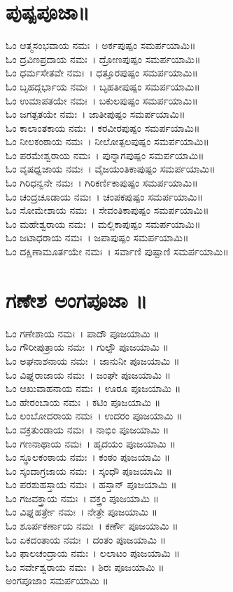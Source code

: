 \section{ಪುಷ್ಪಪೂಜಾ॥}
ಓಂ ಆತ್ಮಸಂಭವಾಯ ನಮಃ~। ಅರ್ಕಪುಷ್ಪಂ ಸಮರ್ಪಯಾಮಿ॥\\
ಓಂ ದ್ರವಿಣಪ್ರದಾಯ ನಮಃ~। ದ್ರೋಣಪುಷ್ಪಂ ಸಮರ್ಪಯಾಮಿ॥\\
ಓಂ ಧರ್ಮಸೇತವೇ ನಮಃ~। ಧತ್ತೂರಪುಷ್ಪಂ ಸಮರ್ಪಯಾಮಿ॥\\
ಓಂ ಬೃಹದ್ಗರ್ಭಾಯ ನಮಃ~। ಬೃಹತೀಪುಷ್ಪಂ ಸಮರ್ಪಯಾಮಿ॥\\
ಓಂ ಉಮಾಪತಯೇ ನಮಃ~। ಬಕುಲಪುಷ್ಪಂ ಸಮರ್ಪಯಾಮಿ॥\\
ಓಂ ಜಗತ್ಪತಯೇ ನಮಃ~। ಜಾತೀಪುಷ್ಪಂ ಸಮರ್ಪಯಾಮಿ॥\\
ಓಂ ಕಾಲಾಂತಕಾಯ ನಮಃ~। ಕರವೀರಪುಷ್ಪಂ ಸಮರ್ಪಯಾಮಿ॥\\
ಓಂ ನೀಲಕಂಠಾಯ ನಮಃ~। ನೀಲೋತ್ಪಲಪುಷ್ಪಂ ಸಮರ್ಪಯಾಮಿ॥\\
ಓಂ ಪರಮೇಶ್ವರಾಯ ನಮಃ~। ಪುನ್ನಾಗಪುಷ್ಪಂ ಸಮರ್ಪಯಾಮಿ॥\\
ಓಂ ವೃಷಧ್ವಜಾಯ ನಮಃ~। ವೈಜಯಂತಿಕಾಪುಷ್ಪಂ ಸಮರ್ಪಯಾಮಿ॥\\
ಓಂ ಗಿರಿಧನ್ವನೇ ನಮಃ~। ಗಿರಿಕರ್ಣಿಕಾಪುಷ್ಪಂ ಸಮರ್ಪಯಾಮಿ॥\\
ಓಂ ಚಂದ್ರಚೂಡಾಯ ನಮಃ~। ಚಂಪಕಪುಷ್ಪಂ ಸಮರ್ಪಯಾಮಿ॥\\
ಓಂ ಸೋಮೇಶಾಯ ನಮಃ~। ಸೇವಂತಿಕಾಪುಷ್ಪಂ ಸಮರ್ಪಯಾಮಿ॥\\
ಓಂ ಮಹೇಶ್ವರಾಯ ನಮಃ~। ಮಲ್ಲಿಕಾಪುಷ್ಪಂ ಸಮರ್ಪಯಾಮಿ॥\\
ಓಂ ಜಟಾಧರಾಯ ನಮಃ~। ಜಪಾಪುಷ್ಪಂ ಸಮರ್ಪಯಾಮಿ॥\\
ಓಂ ದಕ್ಷಿಣಾಮೂರ್ತಯೇ ನಮಃ~। ಸರ್ವಾಣಿ ಪುಷ್ಪಾಣಿ ಸಮರ್ಪಯಾಮಿ॥
\section{ಗಣೇಶ ಅಂಗಪೂಜಾ ॥}
ಓಂ ಗಣೇಶಾಯ ನಮಃ~। ಪಾದೌ ಪೂಜಯಾಮಿ ॥\\
ಓಂ ಗೌರೀಪುತ್ರಾಯ ನಮಃ~। ಗುಲ್ಫೌ ಪೂಜಯಾಮಿ ॥\\
ಓಂ ಅಘನಾಶನಾಯ ನಮಃ~। ಜಾನುನೀ ಪೂಜಯಾಮಿ ॥\\
ಓಂ ವಿಘ್ನರಾಜಾಯ ನಮಃ~। ಜಂಘೇ ಪೂಜಯಾಮಿ ॥\\
ಓಂ ಆಖುವಾಹನಾಯ ನಮಃ~। ಊರೂ ಪೂಜಯಾಮಿ ॥\\
ಓಂ ಹೇರಂಬಾಯ ನಮಃ~। ಕಟಿಂ ಪೂಜಯಾಮಿ ॥\\
ಓಂ ಲಂಬೋದರಾಯ ನಮಃ~। ಉದರಂ ಪೂಜಯಾಮಿ ॥\\
ಓಂ ವಕ್ರತುಂಡಾಯ ನಮಃ~। ನಾಭಿಂ ಪೂಜಯಾಮಿ ॥\\
ಓಂ ಗಣನಾಥಾಯ ನಮಃ~। ಹೃದಯಂ ಪೂಜಯಾಮಿ ॥\\
ಓಂ ಸ್ಥೂಲಕಂಠಾಯ ನಮಃ~। ಕಂಠಂ ಪೂಜಯಾಮಿ ॥\\
ಓಂ ಸ್ಕಂದಾಗ್ರಜಾಯ ನಮಃ~। ಸ್ಕಂಧೌ ಪೂಜಯಾಮಿ ॥\\
ಓಂ ಪರಶುಹಸ್ತಾಯ ನಮಃ~। ಹಸ್ತಾನ್ ಪೂಜಯಾಮಿ ॥\\
ಓಂ ಗಜವಕ್ತ್ರಾಯ ನಮಃ~। ವಕ್ತ್ರಂ ಪೂಜಯಾಮಿ ॥\\
ಓಂ ವಿಘ್ನಹರ್ತ್ರೇ ನಮಃ~। ನೇತ್ರೇ ಪೂಜಯಾಮಿ ॥\\
ಓಂ ಶೂರ್ಪಕರ್ಣಾಯ ನಮಃ~। ಕರ್ಣೌ ಪೂಜಯಾಮಿ ॥\\
ಓಂ ಏಕದಂತಾಯ ನಮಃ~। ದಂತಂ ಪೂಜಯಾಮಿ ॥\\
ಓಂ ಫಾಲಚಂದ್ರಾಯ ನಮಃ~। ಲಲಾಟಂ ಪೂಜಯಾಮಿ ॥\\
ಓಂ ಸರ್ವೇಶ್ವರಾಯ ನಮಃ~। ಶಿರಃ ಪೂಜಯಾಮಿ ॥\\
ಅಂಗಪೂಜಾಂ ಸಮರ್ಪಯಾಮಿ ॥
